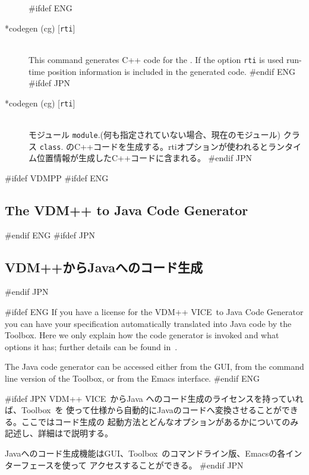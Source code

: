 \documentclass[\pformat,12pt]{article}
\newcommand{\vdmslpp}{VDM-SL}
\newcommand{\Toolbox}{Toolbox}
\newcommand{\vdmslpp}{VDM++}
\newcommand{\Toolbox}{Toolbox}
\renewcommand{\vdmslpp}{VDM++ VICE}
\begin{document}
\begin{description}
#ifdef ENG
\item[*codegen (cg) \ifthenelse{\boolean{VDMsl}}{{[}{\tt
      module}{]}}{{\tt class}} {[}{\tt rti}{]}]   \mbox{}\\
  This command generates C++ code for the
  .
  If the option {\tt rti} is used run-time
  position information is included in the generated code.
#endif ENG
#ifdef JPN
\item[*codegen (cg) \ifthenelse{\boolean{VDMsl}}{{[}{\tt
      module}{]}}{{\tt class}} {[}{\tt rti}{]}] 
  \mbox{}\\
  {モジュール {\tt module}.(何も指定されていない場合、現在のモジュール) }
  {クラス {\tt class}}.  
  のC++コードを生成する。rtiオプションが使われるとランタイム位置情報が生成したC++コードに含まれる。
#endif JPN
\end{description}

\newpage
#ifdef VDMPP
#ifdef ENG
\subsection{The VDM++ to Java Code Generator}\label{sec:cgjava}
#endif ENG
#ifdef JPN
\subsection{VDM++からJavaへのコード生成}\label{sec:cgjava}
#endif JPN

#ifdef ENG
If you have a license  for the \vdmslpp\ to Java
Code Generator you can have your specification automatically 
translated into Java code by the \Toolbox. Here we only explain how the
code generator is invoked and what options it has; further details can
be found in~\cite{CGJavaManPP-SCSK}.

The Java code generator can be accessed either from the GUI, from the
command line version of the \Toolbox, or from the Emacs interface.
#endif ENG

#ifdef JPN
\vdmslpp\ からJava へのコード生成のライセンスを持っていれば、\Toolbox\ を
使って仕様から自動的にJavaのコードへ変換させることができる。ここではコード生成の
起動方法とどんなオプションがあるかについてのみ記述し、詳細は\cite{CGJavaManPP-SCSK}で説明する。

Javaへのコード生成機能はGUI、\Toolbox\ のコマンドライン版、Emacsの各インターフェースを使って
アクセスすることができる。
#endif JPN
\end{document}
